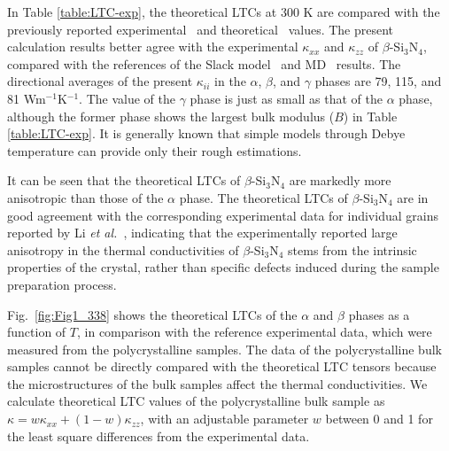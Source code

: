 \documentclass[twocolumn,amsmath,amssymb,a4paper,prb,superscriptaddress,floatfix]{revtex4-1}
\begin{document}
In Table \ref{table:LTC-exp}, the theoretical LTCs at 300 K are compared with
the previously reported experimental~\cite{hirosaki,hirai,li,slack-aln} and
theoretical~\cite{morelli,hirosaki-md,phono3py} values. The present calculation
results better agree with the experimental $\kappa_{xx}$ and $\kappa_{zz}$ of
$\beta$-Si$_3$N$_4$, compared with the references of the Slack
model~\cite{morelli} and MD~\cite{hirosaki-md} results. The directional
averages of the present $\kappa_{ii}$ in the $\alpha$, $\beta$, and $\gamma$
phases are 79, 115, and 81 Wm$^{-1}$K$^{-1}$. The value of the $\gamma$ phase
is just as small as that of the $\alpha$ phase, although the former phase shows
the largest bulk modulus ($B$) in Table \ref{table:LTC-exp}.  It is generally
known that simple models through Debye temperature can provide only their rough
estimations.

It can be seen that the theoretical LTCs of $\beta$-Si$_3$N$_4$ are markedly
more anisotropic than those of the $\alpha$ phase. The theoretical LTCs of
$\beta$-Si$_3$N$_4$ are in good agreement with the corresponding experimental
data for individual grains reported by Li {\it et al.}~\cite{li}, indicating
that the experimentally reported large anisotropy in the thermal conductivities
of $\beta$-Si$_3$N$_4$ stems from the intrinsic properties of the crystal,
rather than specific defects induced during the sample preparation process.

Fig.~\ref{fig:Fig1_338} shows the theoretical LTCs of the $\alpha$  and $\beta$
phases as a function of $T$, in comparison with the reference experimental
data, which were measured from the polycrystalline samples. The data of the
polycrystalline bulk samples cannot be directly compared with the theoretical
LTC tensors because the microstructures of the bulk samples affect the thermal
conductivities.  We calculate theoretical LTC values of the polycrystalline
bulk sample as $\kappa = w\kappa_{xx} + (1-w) \kappa_{zz}$, with an adjustable
parameter $w$ between 0 and 1 for the least square differences from the
experimental data.
\end{document}
